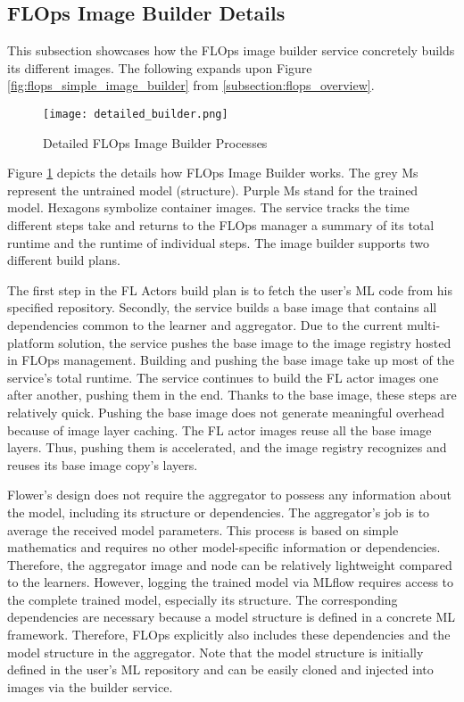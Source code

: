 \subsection{FLOps Image Builder Details}

This subsection showcases how the FLOps image builder service concretely builds its different images.
The following expands upon Figure \ref{fig:flops_simple_image_builder} from \ref{subsection:flops_overview}.

\begin{figure}[p]
    \begin{adjustwidth}{-0.1\paperwidth}{-0.1\paperwidth}
        \centering
        \texttt{[image: detailed\_builder.png]}
        \caption{Detailed FLOps Image Builder Processes}
        \label{fig:detailed_builder}
    \end{adjustwidth}
\end{figure}

Figure \ref{fig:detailed_builder} depicts the details how FLOps Image Builder works.
The grey Ms represent the untrained model (structure).
Purple Ms stand for the trained model.
Hexagons symbolize container images.
The service tracks the time different steps take and returns to the FLOps manager a summary of its total runtime and the runtime of individual steps.
The image builder supports two different build plans.

The first step in the FL Actors build plan is to fetch the user's ML code from his specified repository.
Secondly, the service builds a base image that contains all dependencies common to the learner and aggregator.
Due to the current multi-platform solution, the service pushes the base image to the image registry hosted in FLOps management.
Building and pushing the base image take up most of the service's total runtime.
The service continues to build the FL actor images one after another, pushing them in the end.
Thanks to the base image, these steps are relatively quick.
Pushing the base image does not generate meaningful overhead because of image layer caching.
The FL actor images reuse all the base image layers.
Thus, pushing them is accelerated, and the image registry recognizes and reuses its base image copy's layers.

Flower's design does not require the aggregator to possess any information about the model, including its structure or dependencies.
The aggregator's job is to average the received model parameters.
This process is based on simple mathematics and requires no other model-specific information or dependencies.
Therefore, the aggregator image and node can be relatively lightweight compared to the learners.
However, logging the trained model via MLflow requires access to the complete trained model, especially its structure.
The corresponding dependencies are necessary because a model structure is defined in a concrete ML framework.
Therefore, FLOps explicitly also includes these dependencies and the model structure in the aggregator.
Note that the model structure is initially defined in the user's ML repository and can be easily cloned and injected into images via the builder service.

